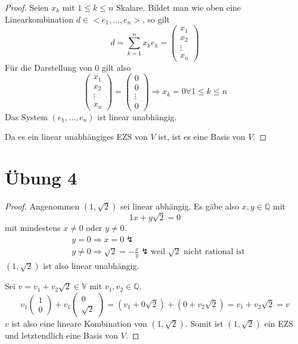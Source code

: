 \documentclass[a4paper,10pt]{article}
\begin{document}
\begin{proof}
 Seien $x_k$ mit $1 \le k \le n$ Skalare.
 Bildet man wie oben eine Linearkombination $d \in <e_1, \dots, e_n>$, so gilt
 \begin{equation*}
  d = \sum_{k = 1}^n x_ke_k = \begin{pmatrix}x_1\\x_2\\\vdots\\x_n\end{pmatrix}
 \end{equation*}
 Für die Darstellung von $0$ gilt also
 \begin{equation*}
  \begin{pmatrix}x_1\\x_2\\\vdots\\x_n\end{pmatrix} = \begin{pmatrix}0\\0\\\vdots\\0\end{pmatrix} \Rightarrow x_k = 0 \forall 1 \le k \le n
 \end{equation*}
 Das System $(e_1, \dots, e_n)$ ist linear unabhängig.
 
 Da es ein linear unabhängiges EZS von $V$ ist, ist es eine Basis von $V$.
\end{proof}

\section*{Übung 4}

\begin{proof}
 Angenommen $(1, \sqrt{2})$ sei linear abhängig.
 Es gäbe also $x, y \in \mathbb{Q}$ mit
 \begin{equation*}
  1x + y\sqrt{2} = 0
 \end{equation*}
 mit mindestens $x \ne 0$ oder $y \ne 0$.
 \begin{align*}
  & y = 0 \Rightarrow x = 0 \lightning\\
  & y \ne 0 \Rightarrow \sqrt{2} = -\frac{x}{y} \lightning \text{weil $\sqrt{2}$ nicht rational ist}
 \end{align*}
 $(1, \sqrt{2})$ ist also linear unabhängig.
 
 Sei $v = v_1 + v_2\sqrt{2} \in \mathbb{V}$ mit $v_1, v_2 \in \mathbb{Q}$.
 \begin{equation*}
  v_1\begin{pmatrix}1\\0\end{pmatrix} + v_1\begin{pmatrix}0\\\sqrt{2}\end{pmatrix} = (v_1 + 0\sqrt{2}) + (0 + v_2\sqrt{2}) = v_1 + v_2\sqrt{2} = v
 \end{equation*}
 $v$ ist also eine lineare Kombination von $(1, \sqrt{2})$.
 Somit ist $(1, \sqrt{2})$ ein EZS und letztendlich eine Basis von $V$.
\end{proof}
\end{document}
